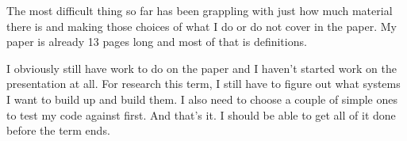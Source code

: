 \documentclass{article}
\theoremstyle{definition}
\begin{document}
The most difficult thing so far has been grappling with just how much material there is and making those choices of what I do or do not cover in the paper.
My paper is already 13 pages long and most of that is definitions.

I obviously still have work to do on the paper and I haven't started work on the presentation at all.
For research this term, I still have to figure out what systems I want to build up and build them.
I also need to choose a couple of simple ones to test my code against first.
And that's it.
I should be able to get all of it done before the term ends.
\end{document}
